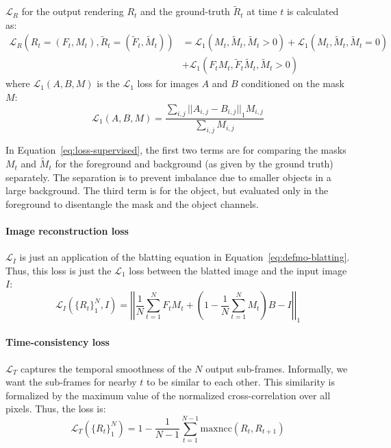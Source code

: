     $\mathcal{L}_R$ for the output rendering $R_t$ and the ground-truth $\tilde{R}_t$ at time $t$ is calculated as:
    \begin{equation}
    \begin{split}
        \mathcal{L}_R(R_t = (F_t, M_t), \tilde{R}_t = (\tilde{F}_t, \tilde{M}_t)) &= \mathcal{L}_1(M_t, \tilde{M}_t, \tilde{M}_t > 0) + \mathcal{L}_1(M_t, \tilde{M}_t, \tilde{M}_t = 0)\\
        &+ \mathcal{L}_1(F_t M_t, \tilde{F}_t \tilde{M}_t, \tilde{M}_t > 0)
    \end{split}%
    \label{eq:loss-supervised}
    \end{equation}
    where $\mathcal{L}_1(A, B, M)$ is the $\mathcal{L}_1$ loss for images $A$ and $B$ conditioned on the mask $M$:
    \begin{equation}
        \mathcal{L}_1(A, B, M) = \frac{\sum_{i, j} {|| A_{i,j} - B_{i,j} ||}_1 M_{i,j}}{\sum_{i,j} M_{i,j}}
    \end{equation}

    In Equation~\ref{eq:loss-supervised}, the first two terms are for comparing the masks $M_t$ and $\tilde{M}_t$ for the foreground and background (as given by the ground truth) separately.
    The separation is to prevent imbalance due to smaller objects in a large background.
    The third term is for the object, but evaluated only in the foreground to disentangle the mask and the object channels.

    \paragraph{Image reconstruction loss}
    $\mathcal{L}_I$ is just an application of the blatting equation in Equation~\ref{eq:defmo-blatting}.
    Thus, this loss is just the $\mathcal{L}_1$ loss between the blatted image and the input image $I$:
    \begin{equation}
        \mathcal{L}_I({\{ R_t \}}_1^N, I) = {\left|\left| \frac{1}{N} \sum_{t=1}^N F_t M_t + \left( 1 - \frac{1}{N} \sum_{t=1}^N M_t \right) B - I \right|\right|}_1
    \end{equation}

    \paragraph{Time-consistency loss}
    $\mathcal{L}_T$ captures the temporal smoothness of the $N$ output sub-frames.
    Informally, we want the sub-frames for nearby $t$ to be similar to each other.
    This similarity is formalized by the maximum value of the normalized cross-correlation over all pixels.
    Thus, the loss is:
    \begin{equation}
        \mathcal{L}_T({\{R_t\}}_1^N) = 1 - \frac{1}{N-1} \sum_{t=1}^{N-1} \mathrm{maxncc}(R_t, R_{t+1})
    \end{equation}

